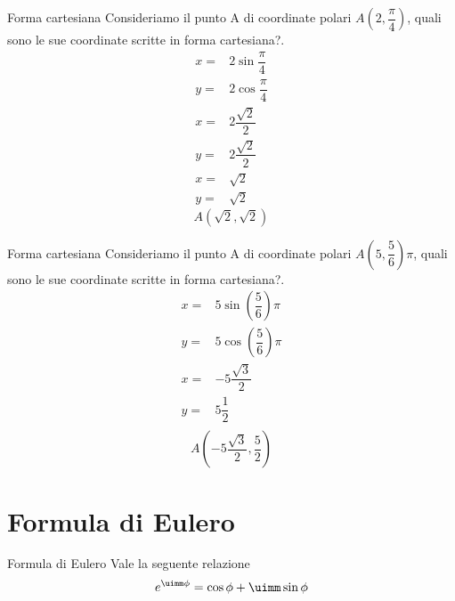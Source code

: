 \begin{esempiot}{Forma cartesiana}{} Consideriamo il punto A di coordinate polari $A(2,\dfrac{\pi}{4})$, quali sono le sue coordinate scritte in forma cartesiana?.
	\begin{align*}
	x=&2\sin\dfrac{\pi}{4}\\
	y=&2\cos\dfrac{\pi}{4}\\
	x=&2\dfrac{\sqrt{2}}{2}\\
	y=&2\dfrac{\sqrt{2}}{2}\\
	x=&\sqrt{2}\\
	y=&\sqrt{2}
	\end{align*}
	\[A(\sqrt{2},\sqrt{2}) \]
\end{esempiot}
\begin{esempiot}{Forma cartesiana}{} Consideriamo il punto A di coordinate polari $A(5,\dfrac{5}{6})\pi$, quali sono le sue coordinate scritte in forma cartesiana?.
	\begin{align*}
	x=&5\sin\left(\dfrac{5}{6}\right)\pi\\
	y=&5\cos\left(\dfrac{5}{6}\right)\pi\\
	x=&-5\dfrac{\sqrt{3}}{2}\\
	y=&5\dfrac{1}{2}\\
		\end{align*}
	\[A(-5\dfrac{\sqrt{3}}{2},\dfrac{5}{2}) \]
\end{esempiot}
\section{Formula di Eulero}
\begin{teoremat}{Formula di Eulero}{}
Vale la seguente relazione	\[e^{\uimm\phi}=\cos\phi+\uimm\sin\phi\]
\end{teoremat}